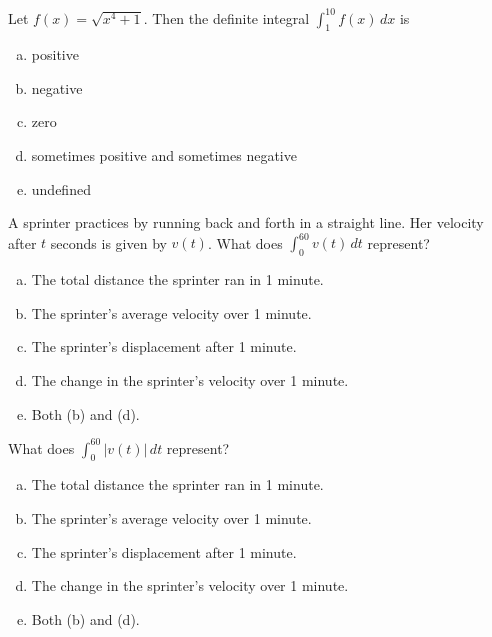 \documentclass[12pt]{article}
\newcommand{\ds}{\displaystyle}
\newenvironment{problem}[2][Problem]{\begin{trivlist}
\item[\hskip \labelsep {\bfseries #1}\hskip \labelsep {\bfseries #2.}]}{\end{trivlist}}
\begin{document}
\newpage

\begin{problem}{13}
Let $f(x) = \sqrt{x^{4} + 1}$. Then the definite integral $\ds\int_{1}^{10}\! f(x)\, dx$ is 
\begin{enumerate}[(a)]
  \item positive
  \item negative
  \item zero
  \item sometimes positive and sometimes negative
  \item undefined
\end{enumerate}
\end{problem}

\vspace{1in}

\begin{problem}{14}
A sprinter practices by running back and forth in a straight line. Her velocity after $t$ seconds is given by $v(t)$. What does $\ds\int_{0}^{60}\! v(t)\, dt$ represent? 
\begin{enumerate}[(a)]
  \item The total distance the sprinter ran in 1 minute. 
  \item The sprinter's average velocity over 1 minute. 
  \item The sprinter's displacement after 1 minute. 
  \item The change in the sprinter's velocity over 1 minute. 
  \item Both (b) and (d). 
\end{enumerate}
\end{problem}

\vspace{1in}

\begin{problem}{15}
What does $\ds\int_{0}^{60}\! |v(t)|\, dt$ represent? 
\begin{enumerate}[(a)]
  \item The total distance the sprinter ran in 1 minute. 
  \item The sprinter's average velocity over 1 minute. 
  \item The sprinter's displacement after 1 minute. 
  \item The change in the sprinter's velocity over 1 minute. 
  \item Both (b) and (d). 
\end{enumerate}
\end{problem}
\end{document}
